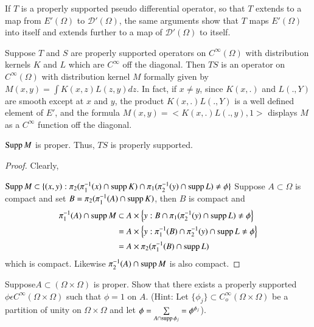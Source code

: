 If $T$ is a properly supported pseudo differential operator, so that
$T$ extends to a map from $E' (\Omega)$ to $\mathcal{D'}(\Omega)$, the
same arguments show that $T$ maps $E'(\Omega)$ into itself
and extends further to a map of $\mathcal{D'}(\Omega)$ to itself. 

Suppose $T$ and $S$ are properly supported operators on $C^{\infty}
(\Omega)$ with distribution kernels $K$ and $L$ which are  $C^\infty$
off the diagonal. Then $TS$ is an operator on $C^ \infty (\Omega)$
with distribution kernel $M$ formally given by $M(x,y)= \int K (x,z)L
(z,y)dz$. In fact, if $x \neq y$, since $K(x,.)$ and $L(.,Y)$ are
smooth except at $x$ and $y$, the product $K(x,.)L(., Y)$ is a well
defined element of $E'$, and the formula $M(x,y)=<K(x,.)L(.,y),1 >$
displays $M$ as a $C^ \infty$ function off the diagonal. 

\setcounter{prop}{23}
\begin{prop}\label{chap4:sec4:prop4.24} %
  $\operatorname{Supp} M$ is proper. Thus, $TS$ is properly supported.
\end{prop}

\begin{proof}
  Clearly,

  $\operatorname{Supp} M \subset \{ (x,y): \pi _2 (\pi _1^{-1}(x)\cap \operatorname{supp} K) \cap
  \pi_1 (\pi^{-1}_2 (y) \cap \operatorname{supp} L) \neq \phi \}$ Suppose $A \subset
  \Omega$ is compact and set $B= \pi_2 (\pi ^{-1}_1 (A) \cap \operatorname{supp} K)$,
  then $B$ is compact and 
  \begin{align*}
    \pi_1^{-1}(A) \cap \operatorname{supp} M &\subset A \times \left\{ y: B \cap \pi_1 (\pi
    ^{-1}_2 (y)\cap \operatorname{supp} L) \neq \phi \right\}\\
    &= A \times \left\{ y:\pi^{-1}_1 (B) \cap \pi ^{-1}_2 (y) \cap \operatorname{supp} L
    \neq \phi \right\}\\ 
    &= A \times \pi _2 (\pi ^{-1}_1 (B) \cap \operatorname{supp} L)
  \end{align*}
  which is compact. Likewise $\pi ^{-1}_2 (A)\cap \operatorname{supp} M$ is also compact.
\end{proof}

\begin{exercise}
  Suppose\pageoriginale $A \subset (\Omega \times \Omega)$ is proper.  Show that there
  exists a properly supported $\phi \epsilon C^ \infty (\Omega \times
  \Omega)$ such that $\phi =1$ on $A$. (Hint: Let $\{ \phi _j \} \subset
  C^\infty_o (\Omega \times \Omega)$ be a partition of unity on
  $\Omega \times \Omega$ and let $\phi = \sum\limits_{A \cap \operatorname{supp}
    \phi_j}=\phi^{\phi_j}$). 
\end{exercise} 

